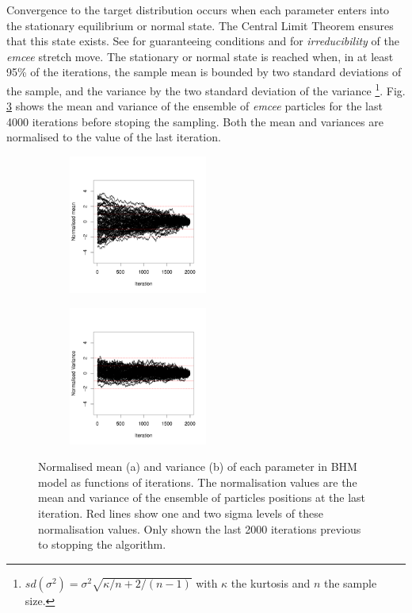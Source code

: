 Convergence to the target distribution occurs when each parameter enters into the stationary equilibrium or normal state. The Central Limit Theorem ensures that this state exists. See \citet{Roberts2004} for guaranteeing conditions and \citet{Goodman2010} for \emph{irreducibility} of the \emph{emcee} stretch move. The stationary or normal state is reached when, in at least 95\% of the iterations, the sample mean is bounded by two standard deviations of the sample, and the variance by the two standard deviation of the variance \footnote{
$sd(\sigma^2)=\sigma^2 \sqrt{\kappa/n + 2/(n-1)}$ with $\kappa$ the kurtosis and $n$ the sample size.
}. Fig. \ref{fig:convergence} shows the mean and variance of the ensemble of \emph{emcee} particles for the last 4000 iterations before stoping the sampling. Both the mean and variances are normalised to the value of the last iteration.


\begin{figure}[H]
    \centering
    \begin{subfigure}[t]{\textwidth}
    \centering
        \includegraphics[width=0.5\textwidth]{background/Figures/AllMeanParticles.pdf}
        \caption{}
        \label{}
    \end{subfigure}
    \begin{subfigure}[t]{\textwidth}
    \centering
      \includegraphics[width=0.5\textwidth]{background/Figures/AllVarParticles.pdf}
        \caption{}
        \label{} 
    \end{subfigure}
\caption{Normalised mean (a) and variance (b) of each parameter in BHM model as functions of iterations. The normalisation values are the mean and variance of the ensemble of particles positions at the last iteration. Red lines show one and two sigma levels of these normalisation values. Only shown the last 2000 iterations previous to stopping the algorithm.}
\label{fig:convergence}
\end{figure}


